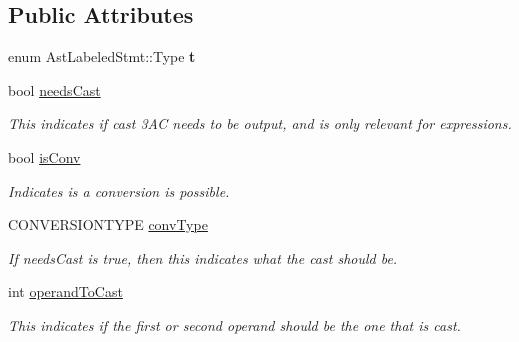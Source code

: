 \subsection*{Public Attributes}
\begin{DoxyCompactItemize}
\item 
\hypertarget{classAstLabeledStmt_afea3a3521336c57c6fb7bc588a635b1c}{enum Ast\-Labeled\-Stmt\-::\-Type {\bfseries t}}\label{classAstLabeledStmt_afea3a3521336c57c6fb7bc588a635b1c}

\item 
\hypertarget{classAST_aaf215802de409f8096c063d01ffa6783}{bool \hyperlink{classAST_aaf215802de409f8096c063d01ffa6783}{needs\-Cast}}\label{classAST_aaf215802de409f8096c063d01ffa6783}

\begin{DoxyCompactList}\small\item\em This indicates if cast 3\-A\-C needs to be output, and is only relevant for expressions. \end{DoxyCompactList}\item 
\hypertarget{classAST_afa9e77ef650ec6664458fa6cb55be985}{bool \hyperlink{classAST_afa9e77ef650ec6664458fa6cb55be985}{is\-Conv}}\label{classAST_afa9e77ef650ec6664458fa6cb55be985}

\begin{DoxyCompactList}\small\item\em Indicates is a conversion is possible. \end{DoxyCompactList}\item 
\hypertarget{classAST_a61ef3317e023d45237e06615b387cd6b}{C\-O\-N\-V\-E\-R\-S\-I\-O\-N\-T\-Y\-P\-E \hyperlink{classAST_a61ef3317e023d45237e06615b387cd6b}{conv\-Type}}\label{classAST_a61ef3317e023d45237e06615b387cd6b}

\begin{DoxyCompactList}\small\item\em If needs\-Cast is true, then this indicates what the cast should be. \end{DoxyCompactList}\item 
\hypertarget{classAST_aea9b07b39d24183f38c0029cec0a878e}{int \hyperlink{classAST_aea9b07b39d24183f38c0029cec0a878e}{operand\-To\-Cast}}\label{classAST_aea9b07b39d24183f38c0029cec0a878e}

\begin{DoxyCompactList}\small\item\em This indicates if the first or second operand should be the one that is cast. \end{DoxyCompactList}\end{DoxyCompactItemize}
